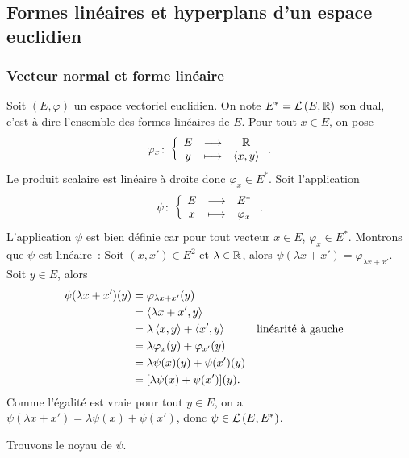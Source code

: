 \subsection{Formes linéaires et hyperplans d'un espace euclidien}

\subsubsection{Vecteur normal et forme linéaire}

Soit $(E,\varphi)$ un espace vectoriel euclidien. On note $E^*=\mathcal{L}\left(E,\mathbb{R}\right)$ son dual, c'est-à-dire l'ensemble des formes linéaires de $E$. Pour tout $x \in E$, on pose
\begin{equation}
  \varphi_x\colon \left\{\begin{array}{ccc} E & \longrightarrow &\mathbb{R}\\ y & \longmapsto & \left\langle{x},{y}\right\rangle \end{array} \right..
\end{equation}
Le produit scalaire est linéaire à droite donc $\varphi_x \in E^*$. Soit l'application
\begin{equation}
  \psi\colon \left\{\begin{array}{ccc} E & \longrightarrow &E^*\\ x & \longmapsto & \varphi_x \end{array} \right..
\end{equation}
L'application $\psi$ est bien définie car pour tout vecteur $x \in E$, $\varphi_x \in E^*$. Montrons que $\psi$ est linéaire~: Soit $(x,x') \in E^2$ et $\lambda \in \mathbb{R}$, alors $\psi(\lambda x+x') = \varphi_{\lambda x+x'}$. Soit $y \in E$, alors
\begin{align}
  \psi(\lambda x+x')(y) &= \varphi_{\lambda x+x'}(y) \\
  &=\left\langle{\lambda x+x'},{y}\right\rangle \\
  &=\lambda \left\langle{x},{y}\right\rangle + \left\langle{x'},{y}\right\rangle && \text{linéarité à gauche}\\
  &=\lambda \varphi_x(y)+ \varphi_{x'}(y) \\
  &=\lambda \psi(x)(y)+\psi(x')(y)\\
  &=[\lambda \psi(x)+\psi(x')](y).
\end{align}
Comme l'égalité est vraie pour tout $y \in E$, on a $\psi(\lambda x+x')=\lambda \psi(x)+\psi(x')$, donc $\psi \in \mathcal{L}\left(E,E^*\right)$.

Trouvons le noyau de $\psi$.


